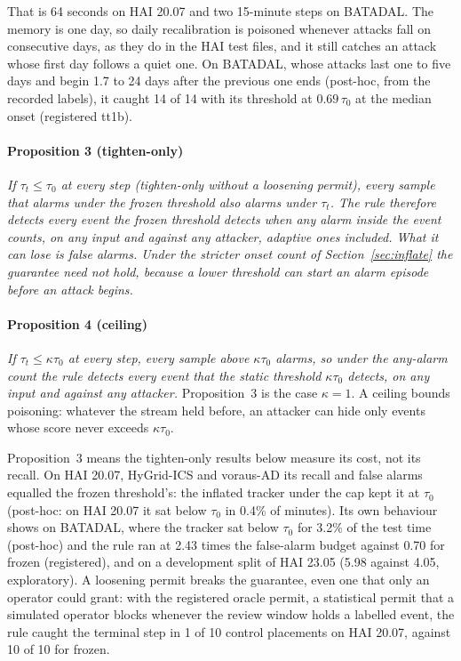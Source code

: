\documentclass[sigconf]{acmart}
\begin{document}
That is 64 seconds on HAI 20.07 and two 15-minute steps on BATADAL. The memory is one day, so daily
recalibration is poisoned whenever attacks fall on consecutive days, as they do in the HAI test
files, and it still catches an attack whose first day follows a quiet one. On BATADAL, whose attacks
last one to five days and begin 1.7 to 24 days after the previous one ends (post-hoc, from the recorded
labels), it caught 14 of 14 with its threshold at $0.69\,\tau_0$ at the median onset (registered tt1b).

\paragraph{Proposition 3 (tighten-only)} \emph{If $\tau_t \le \tau_0$ at every step (tighten-only
without a loosening permit), every sample that alarms under the frozen threshold also alarms under
$\tau_t$. The rule therefore detects every event the frozen threshold detects when any alarm inside the
event counts, on any input and against any attacker, adaptive ones included. What it can lose is false
alarms. Under the stricter onset count of Section~\ref{sec:inflate} the guarantee need not hold,
because a lower threshold can start an alarm episode before an attack begins.}

\paragraph{Proposition 4 (ceiling)} \emph{If $\tau_t \le \kappa\tau_0$ at every step, every sample above
$\kappa\tau_0$ alarms, so under the any-alarm count the rule detects every event that the static
threshold $\kappa\tau_0$ detects, on any input and against any attacker.} Proposition~3 is the case
$\kappa = 1$. A ceiling bounds poisoning: whatever the stream held before, an attacker can hide only
events whose score never exceeds $\kappa\tau_0$.

Proposition~3 means the tighten-only results below measure its cost, not its recall. On HAI 20.07,
HyGrid-ICS and voraus-AD its recall and false alarms equalled the frozen threshold's: the inflated
tracker under the cap kept it at $\tau_0$ (post-hoc: on HAI 20.07 it sat below $\tau_0$ in 0.4\% of
minutes). Its own behaviour shows on BATADAL, where the tracker sat below $\tau_0$ for 3.2\% of the
test time (post-hoc) and the rule ran at 2.43 times the false-alarm budget against 0.70 for frozen
(registered), and on a development split of HAI 23.05 (5.98 against 4.05, exploratory). A loosening
permit breaks the guarantee, even one that only an operator could grant: with the registered oracle
permit, a statistical permit that a simulated operator blocks whenever the review window holds a
labelled event, the rule caught the terminal step in 1 of 10 control placements on HAI 20.07, against
10 of 10 for frozen.
\end{document}
